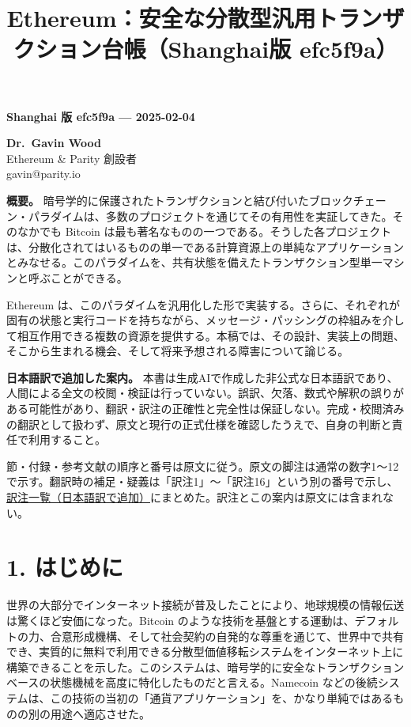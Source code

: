 \documentclass[
]{ltjsarticle}
\title{Ethereum：安全な分散型汎用トランザクション台帳（Shanghai版
efc5f9a）}
\author{}
\date{}
\begin{document}
\maketitle

\begin{center}

\textbf{Shanghai 版 efc5f9a --- 2025-02-04}

\textbf{Dr.~Gavin Wood}\\
Ethereum \& Parity 創設者\\
gavin@parity.io

\end{center}

\textbf{概要。}
暗号学的に保護されたトランザクションと結び付いたブロックチェーン・パラダイムは、多数のプロジェクトを通じてその有用性を実証してきた。そのなかでも
Bitcoin
は最も著名なものの一つである。そうした各プロジェクトは、分散化されてはいるものの単一である計算資源上の単純なアプリケーションとみなせる。このパラダイムを、共有状態を備えたトランザクション型単一マシンと呼ぶことができる。

Ethereum
は、このパラダイムを汎用化した形で実装する。さらに、それぞれが固有の状態と実行コードを持ちながら、メッセージ・パッシングの枠組みを介して相互作用できる複数の資源を提供する。本稿では、その設計、実装上の問題、そこから生まれる機会、そして将来予想される障害について論じる。

\textbf{日本語訳で追加した案内。}
本書は生成AIで作成した非公式な日本語訳であり、人間による全文の校閲・検証は行っていない。誤訳、欠落、数式や解釈の誤りがある可能性があり、翻訳・訳注の正確性と完全性は保証しない。完成・校閲済みの翻訳として扱わず、原文と現行の正式仕様を確認したうえで、自身の判断と責任で利用すること。

節・付録・参考文献の順序と番号は原文に従う。原文の脚注は通常の数字1〜12で示す。翻訳時の補足・疑義は「訳注1」〜「訳注16」という別の番号で示し、\protect\hyperlink{translator-notes}{訳注一覧（日本語訳で追加）}にまとめた。訳注とこの案内は原文には含まれない。

\clearpage
{\setcounter{tocdepth}{3}\tableofcontents}
\clearpage

\protect\hypertarget{sec:introduction}{}{}

\hypertarget{ux306fux3058ux3081ux306b}{%
\section{1. はじめに}\label{ux306fux3058ux3081ux306b}}

世界の大部分でインターネット接続が普及したことにより、地球規模の情報伝送は驚くほど安価になった。Bitcoin
のような技術を基盤とする運動は、デフォルトの力、合意形成機構、そして社会契約の自発的な尊重を通じて、世界中で共有でき、実質的に無料で利用できる分散型価値移転システムをインターネット上に構築できることを示した。このシステムは、暗号学的に安全なトランザクションベースの状態機械を高度に特化したものだと言える。Namecoin
などの後続システムは、この技術の当初の「通貨アプリケーション」を、かなり単純ではあるものの別の用途へ適応させた。
\end{document}
